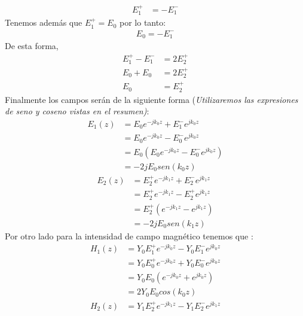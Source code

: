 \documentclass[
  11pt,
  letterpaper,
   addpoints,
   answers
  ]{exam}
\begin{document}
\begin{questions}
\begin{solution}
\begin{enumerate}
\begin{align}
                E_{1}^{+} &= -E_{1}^{-}
            \end{align}
            Tenemos además que $E_{1}^{+}=E_{0}$ por lo tanto:
            \begin{align}
                E_{0}= -E_{1}^{-} 
            \end{align}
            De esta forma,
            \begin{align}
                E_{1}^{+} - E_{1}^{-} &= 2E_{2}^{+}\\
                E_{0} + E_{0} &= 2E_{2}^{+}\\
                E_{0} &= E_{2}^{+}
            \end{align}
            Finalmente los campos serán de la siguiente forma (\textit{Utilizaremos las expresiones de seno y coseno vistas en el resumen)}:
            \begin{align}
                E_{1}(z) &= E_{0}e^{-jk_{0}z} + E_{1}^{-}e^{jk_{0}z}\\
                  &=E_{0}e^{-jk_{0}z} - E_{0}^{-}e^{jk_{0}z}\\
                  &= E_{0}(E_{0}e^{-jk_{0}z} - E_{0}^{-}e^{jk_{0}z})\\
                  &= -2jE_{0} sen(k_{0}z)
            \end{align}
            \begin{align}
                E_{2}(z) &= E_{2}^{+}e^{-jk_{1}z} + E_{2}^{-}e^{jk_{1}z}\\
                  &=E_{2}^{+}e^{-jk_{1}z} - E_{2}^{+}e^{jk_{1}z}\\
                  &= E_{2}^{+}(e^{-jk_{1}z} - e^{jk_{1}z})\\
                  &= -2jE_{0} sen(k_{1}z)
            \end{align}
            Por otro lado para la intensidad de campo magnético tenemos que :
            \begin{align}
                H_{1}(z) &= Y_{0}E_{1}^{+}e^{-jk_{0}z} - Y_{0}E_{1}^{-}e^{jk_{0}z}\\
                &= Y_{0}E_{0}^{+}e^{-jk_{0}z} + Y_{0}E_{0}^{-}e^{jk_{0}z}\\
                &= Y_{0}E_{0}(e^{-jk_{0}z} + e^{jk_{0}z} )\\
                &=2Y_{0}E_{0}cos(k_{0}z)
            \end{align}
            \begin{align}
                H_{2}(z) &= Y_{1}E_{2}^{+}e^{-jk_{1}z} - Y_{1}E_{2}^{-}e^{jk_{1}z}\\

\end{align}
\end{enumerate}
\end{solution}
\end{questions}
\end{document}
